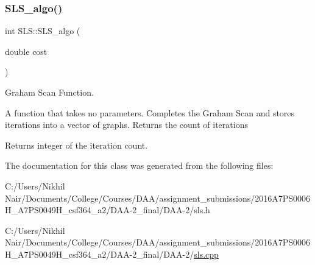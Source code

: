 \subsubsection{\texorpdfstring{SLS\_algo()}{SLS\_algo()}}
{\footnotesize\ttfamily int S\+L\+S\+::\+S\+L\+S\+\_\+algo (\begin{DoxyParamCaption}\item[{double}]{cost }\end{DoxyParamCaption})\hspace{0.3cm}{\ttfamily [static]}}



Graham Scan Function. 

A function that takes no parameters. Completes the Graham Scan and stores iterations into a vector of graphs. Returns the count of iterations

\begin{DoxyReturn}{Returns}
integer of the iteration count. 
\end{DoxyReturn}


The documentation for this class was generated from the following files\+:\begin{DoxyCompactItemize}
\item 
C\+:/\+Users/\+Nikhil Nair/\+Documents/\+College/\+Courses/\+D\+A\+A/assignment\+\_\+submissions/2016\+A7\+P\+S0006\+H\+\_\+A7\+P\+S0049\+H\+\_\+csf364\+\_\+a2/\+D\+A\+A-\/2\+\_\+final/\+D\+A\+A-\/2/sls.\+h\item 
C\+:/\+Users/\+Nikhil Nair/\+Documents/\+College/\+Courses/\+D\+A\+A/assignment\+\_\+submissions/2016\+A7\+P\+S0006\+H\+\_\+A7\+P\+S0049\+H\+\_\+csf364\+\_\+a2/\+D\+A\+A-\/2\+\_\+final/\+D\+A\+A-\/2/\mbox{\hyperlink{sls_8cpp}{sls.\+cpp}}\end{DoxyCompactItemize}
